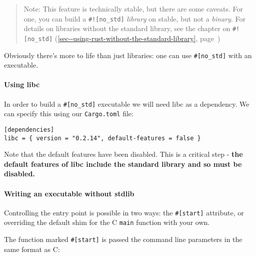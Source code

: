\documentclass[a4paper,]{book}
\renewcommand*{\hyperlink}[2]{%
 #2 (\autoref{#1}, page~\pageref{#1})}
\let\oldparagraph\paragraph
\renewcommand{\paragraph}[1]{\oldparagraph{#1}\mbox{}}
\begin{document}
\begin{quote}
Note: This feature is technically stable, but there are some caveats.
For one, you can build a \texttt{\#!{[}no\_std{]}} \emph{library} on
stable, but not a \emph{binary}. For details on libraries without the
standard library, see
\protect\hyperlink{sec--using-rust-without-the-standard-library}{the
chapter on \texttt{\#!{[}no\_std{]}}}
\end{quote}

Obviously there's more to life than just libraries: one can use
\texttt{\#{[}no\_std{]}} with an executable.

\paragraph{Using libc}\label{using-libc}

In order to build a \texttt{\#{[}no\_std{]}} executable we will need
libc as a dependency. We can specify this using our \texttt{Cargo.toml}
file:

\begin{verbatim}
[dependencies]
libc = { version = "0.2.14", default-features = false }
\end{verbatim}

Note that the default features have been disabled. This is a critical
step - \textbf{the default features of libc include the standard library
and so must be disabled.}

\paragraph{Writing an executable without
stdlib}\label{writing-an-executable-without-stdlib}

Controlling the entry point is possible in two ways: the
\texttt{\#{[}start{]}} attribute, or overriding the default shim for the
C \texttt{main} function with your own.

The function marked \texttt{\#{[}start{]}} is passed the command line
parameters in the same format as C:
\end{document}
